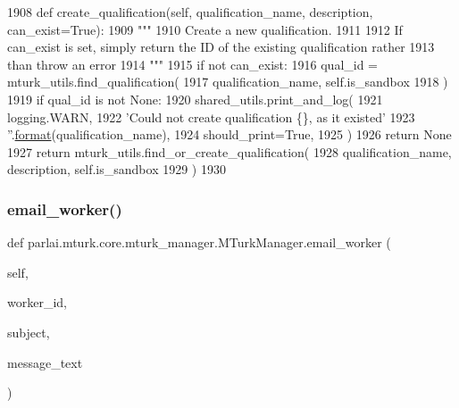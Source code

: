 \begin{DoxyCode}
1908     \textcolor{keyword}{def }create\_qualification(self, qualification\_name, description, can\_exist=True):
1909         \textcolor{stringliteral}{"""}
1910 \textcolor{stringliteral}{        Create a new qualification.}
1911 \textcolor{stringliteral}{}
1912 \textcolor{stringliteral}{        If can\_exist is set, simply return the ID of the existing qualification rather}
1913 \textcolor{stringliteral}{        than throw an error}
1914 \textcolor{stringliteral}{        """}
1915         \textcolor{keywordflow}{if} \textcolor{keywordflow}{not} can\_exist:
1916             qual\_id = mturk\_utils.find\_qualification(
1917                 qualification\_name, self.is\_sandbox
1918             )
1919             \textcolor{keywordflow}{if} qual\_id \textcolor{keywordflow}{is} \textcolor{keywordflow}{not} \textcolor{keywordtype}{None}:
1920                 shared\_utils.print\_and\_log(
1921                     logging.WARN,
1922                     \textcolor{stringliteral}{'Could not create qualification \{\}, as it existed'}
1923                     \textcolor{stringliteral}{''}.\hyperlink{namespaceparlai_1_1chat__service_1_1services_1_1messenger_1_1shared__utils_a32e2e2022b824fbaf80c747160b52a76}{format}(qualification\_name),
1924                     should\_print=\textcolor{keyword}{True},
1925                 )
1926                 \textcolor{keywordflow}{return} \textcolor{keywordtype}{None}
1927         \textcolor{keywordflow}{return} mturk\_utils.find\_or\_create\_qualification(
1928             qualification\_name, description, self.is\_sandbox
1929         )
1930 
\end{DoxyCode}
\mbox{\label{classparlai_1_1mturk_1_1core_1_1mturk__manager_1_1MTurkManager_afd2e53ad36f1975af45cc64c0940a41f}} 
\subsubsection{\texorpdfstring{email\+\_\+worker()}{email\_worker()}}
{\footnotesize\ttfamily def parlai.\+mturk.\+core.\+mturk\+\_\+manager.\+M\+Turk\+Manager.\+email\+\_\+worker (\begin{DoxyParamCaption}\item[{}]{self,  }\item[{}]{worker\+\_\+id,  }\item[{}]{subject,  }\item[{}]{message\+\_\+text }\end{DoxyParamCaption})}

